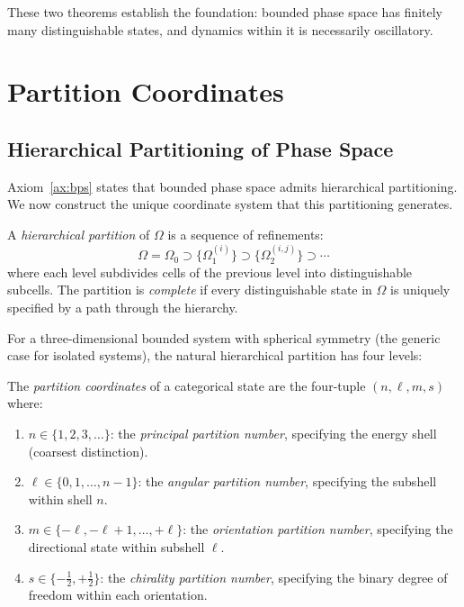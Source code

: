 These two theorems establish the foundation: bounded phase space has finitely many distinguishable states, and dynamics within it is necessarily oscillatory.

\section{Partition Coordinates}
\label{sec:coordinates}

\subsection{Hierarchical Partitioning of Phase Space}

Axiom~\ref{ax:bps} states that bounded phase space admits hierarchical partitioning. We now construct the unique coordinate system that this partitioning generates.

\begin{definition}
\label{def:partition}
A \emph{hierarchical partition} of $\Omega$ is a sequence of refinements:
\begin{equation}
    \Omega = \Omega_0 \supset \{\Omega_1^{(i)}\} \supset \{\Omega_2^{(i,j)}\} \supset \cdots
\end{equation}
where each level subdivides cells of the previous level into distinguishable subcells. The partition is \emph{complete} if every distinguishable state in $\Omega$ is uniquely specified by a path through the hierarchy.
\end{definition}

For a three-dimensional bounded system with spherical symmetry (the generic case for isolated systems), the natural hierarchical partition has four levels:

\begin{definition}
\label{def:partition_coords}
The \emph{partition coordinates} of a categorical state are the four-tuple $(n, \ell, m, s)$ where:
\begin{enumerate}[label=(\roman*)]
    \item $n \in \{1, 2, 3, \ldots\}$: the \emph{principal partition number}, specifying the energy shell (coarsest distinction).
    \item $\ell \in \{0, 1, \ldots, n-1\}$: the \emph{angular partition number}, specifying the subshell within shell $n$.
    \item $m \in \{-\ell, -\ell+1, \ldots, +\ell\}$: the \emph{orientation partition number}, specifying the directional state within subshell $\ell$.
    \item $s \in \{-\tfrac{1}{2}, +\tfrac{1}{2}\}$: the \emph{chirality partition number}, specifying the binary degree of freedom within each orientation.
\end{enumerate}
\end{definition}

